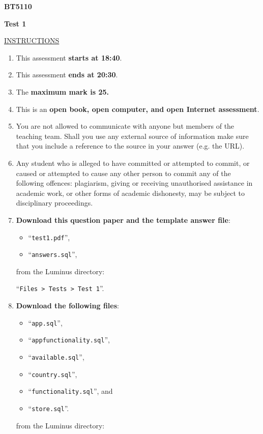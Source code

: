 \documentclass[10pt,a4paper,answers]{exam}
\begin{document}
\begin{center}
{\sf\large \bf BT5110}
\end{center}
\begin{center}
{\sf\large \bf Test 1}
\end{center}
\vspace{2.3cm}

\underline{{\large{\sf INSTRUCTIONS}}}

\begin{enumerate}
\item This assessment {\bf starts at 18:40}.
\item This assessment {\bf ends at 20:30}.
\item The {\bf maximum mark is 25.}
\item This is an {\bf open book, open computer, and open Internet assessment}.
\item You are not allowed to communicate with anyone but  members of the teaching team. Shall you use any external source of information make sure that you include a reference to the source in your answer (e.g. the URL).
\item Any student who is alleged to have committed or attempted to commit, or caused or attempted to cause any other person to commit any of the following offences: plagiarism, giving or receiving unauthorised assistance in academic work, or other forms of academic dishonesty, may be subject to disciplinary proceedings.

\item{\bf Download this question paper and the template answer file}:
\begin{itemize}
    \item  ``\verb+test1.pdf+'',
    \item  ``\verb+answers.sql+'',
\end{itemize}
from the Luminus directory:

``\verb+Files > Tests > Test 1+''.
\item {\bf Download the following files}:
\begin{itemize}
    \item ``\verb+app.sql+'',
    \item ``\verb+appfunctionality.sql+'',
    \item ``\verb+available.sql+'',
    \item ``\verb+country.sql+'',
    \item ``\verb+functionality.sql+'', and
    \item ``\verb+store.sql+''.
\end{itemize}
  from the Luminus directory:


\end{enumerate}
\end{document}
